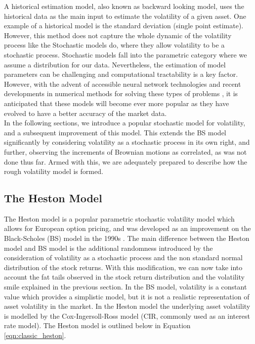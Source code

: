 \documentclass[12pt,oneside]{article}
\begin{document}
A historical estimation model, also known as backward looking model, uses the historical data as the main input to estimate the volatility of a given asset. One example of a historical model is the standard deviation (single point estimate). However, this method does not capture the whole dynamic of the volatility process like the Stochastic models do, where they allow volatility to be a stochastic process. Stochastic models fall into the parametric category where we assume a distribution for our data. Nevertheless, the estimation of model parameters can be challenging and computational tractability is a key factor. However, with the advent of accessible neural network technologies and recent developments in numerical methods for solving these types of problems \cite{Horvath2019}, it is anticipated that these models will become ever more popular as they have evolved to have a better accuracy of the market data.
\\

In the following sections, we introduce a popular stochastic model for volatility, and a subsequent improvement of this model. This extends the BS model significantly by considering volatility as a stochastic process in its own right, and further, observing the increments of Brownian motions as correlated, as was not done thus far. Armed with this, we are adequately prepared to describe how the rough volatility model is formed.


\subsection{The Heston Model}
The Heston model is a popular parametric stochastic volatility model which allows for European option pricing, and was developed as an improvement on the Black-Scholes (BS) model in the 1990s \cite{Douglas1993}. The main difference between the Heston model and BS model is the additional randomness introduced by the consideration of volatility as a stochastic process and the non standard normal distribution of the stock returns. With this modification, we can now take into account the fat tails observed in the stock return distribution and the volatility smile explained in the previous section. In the BS model, volatility is a constant value which provides a simplistic model, but it is not a realistic representation of asset volatility in the market. In the Heston model the underlying asset volatility is modelled by the Cox-Ingersoll-Ross model (CIR, commonly used as an interest rate model). The Heston model is outlined below in Equation \ref{eqn:classic_heston}.
\end{document}
